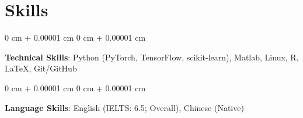 \documentclass[10pt, letterpaper]{article}
\newenvironment{onecolentry}{
    \begin{adjustwidth}{
        0 cm + 0.00001 cm
    }{
        0 cm + 0.00001 cm
    }
}{
    \end{adjustwidth}
} %
\begin{document}



 \vspace{0.1 cm}

\section{Skills}

\begin{onecolentry}
    \textbf{Technical Skills}: Python (PyTorch, TensorFlow, scikit-learn), Matlab, Linux, R, LaTeX, Git/GitHub
\end{onecolentry}

\vspace{0.2 cm}

\begin{onecolentry}
    \textbf{Language Skills}: English (IELTS: 6.5; Overall), Chinese (Native)
\end{onecolentry}



    




\end{document}
